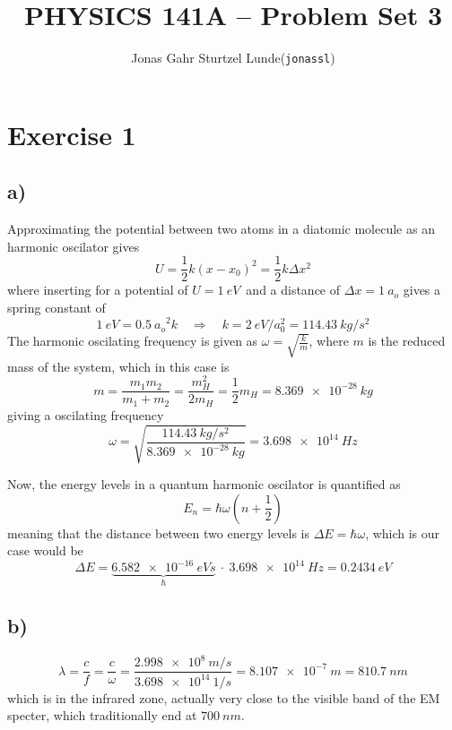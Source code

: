 \documentclass[12p,a4paper]{article}
\newcommand{\half}{\frac{1}{2}}
\begin{document}
\title{PHYSICS 141A -- Problem Set 3}
\author{
    \begin{tabular}{r l}
        Jonas Gahr Sturtzel Lunde & (\texttt{jonassl})
    \end{tabular}}

\maketitle

\hspace{10cm}

\section*{Exercise 1}
\subsection*{a)}
Approximating the potential between two atoms in a diatomic molecule as an harmonic oscilator gives
\[
    U = \half k(x - x_0)^2 = \half k\Delta x^2
\]
where inserting for a potential of $U = \SI{1}{eV}$ and a distance of $\Delta x = \SI{1}{a_o}$ gives a spring constant of 
\[
    \SI{1}{eV} = \SI{0.5}{a_o}^2 k \quad\Rightarrow\quad k = \SI{2}{eV/a_0^2} = \SI{114.43}{kg/s^2}
\]
The harmonic oscilating frequency is given as $\omega = \sqrt{\frac{k}{m}}$, where $m$ is the reduced mass of the system, which in this case is
\[
    m = \frac{m_1m_2}{m_1 + m_2} = \frac{m_H^2}{2m_H} = \half m_H = \SI{8.369e-28}{kg}
\]
giving a oscilating frequency
\[
    \omega = \sqrt{\frac{\SI{114.43}{kg/s^2}}{\SI{8.369e-28}{kg}}} = \SI{3.698e14}{Hz}
\]

Now, the energy levels in a quantum harmonic oscilator is quantified as
\[
    E_n = \hbar\omega(n + \half)
\]
meaning that the distance between two energy levels is $\Delta E = \hbar\omega$, which is our case would be
\[
    \Delta E = \underbrace{\SI{6.582e-16}{eV s}}_{\hbar} \ \cdot \ \SI{3.698e14}{Hz} = \SI{0.2434}{eV}
\]


\subsection*{b)}
\[
    \lambda = \frac{c}{f} = \frac{c}{\omega} = \frac{\SI{2.998e8}{m/s}}{\SI{3.698e14}{1/s}} = \SI{8.107e-7}{m} = \SI{810.7}{nm}
\]
which is in the infrared zone, actually very close to the visible band of the EM specter, which traditionally end at $\SI{700}{nm}$.
\end{document}

